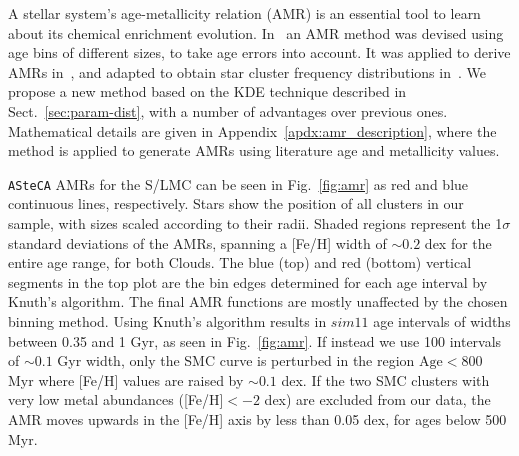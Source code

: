 \documentclass{aa}
\begin{document}
A stellar system's age-metallicity relation (AMR) is an essential tool to learn
about its chemical enrichment evolution.
%
In~\cite{Piatti_2010_AMR} an AMR method was devised using age bins of different
sizes, to take age errors into account. It was applied to derive AMRs
in~\cite{Piatti_Geisler_2013}, and adapted to obtain star cluster frequency
distributions in~\cite{Piatti_2013_CF}.
%
We propose a new method based on the KDE technique described in
Sect.~\ref{sec:param-dist}, with a number of advantages over previous ones.
Mathematical details are given in Appendix~\ref{apdx:amr_description}, where
the method is applied to generate AMRs using literature age and metallicity
values.

\texttt{ASteCA} AMRs for the S/LMC can be seen in Fig.~\ref{fig:amr} as red and
blue continuous lines, respectively. Stars show the position of all clusters in
our sample, with sizes scaled according to their radii.
%
Shaded regions represent the 1$\sigma$ standard deviations of the AMRs, spanning
a [Fe/H] width of ${\sim}0.2$ dex for the entire age range, for both Clouds.
The blue (top) and red (bottom) vertical segments in the top plot are the bin
edges determined for each age interval by Knuth's algorithm.
%
The final AMR functions are mostly unaffected by the chosen binning method.
Using Knuth's algorithm results in ${sim}11$ age intervals of widths between
0.35 and 1 Gyr, as seen in Fig.~\ref{fig:amr}. If instead we use 100 intervals
of ${\sim}0.1$ Gyr width, only the SMC curve is perturbed in the region
$\mathrm{Age}{<800}$ Myr where [Fe/H] values are raised by ${\sim}0.1$ dex.
%
%
If the two SMC clusters with very low metal abundances ([Fe/H]${<-}2$ dex) are
excluded from our data, the AMR moves upwards in the [Fe/H] axis by less than
0.05 dex, for ages below 500 Myr.
\end{document}
